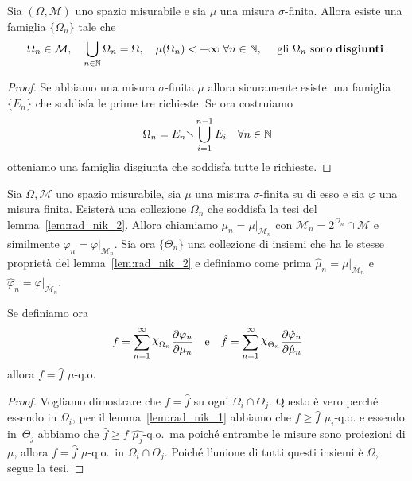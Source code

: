 \begin{lemma}\label{lem:rad_nik_2}
    Sia \({(\Omega, \mathcal{M})}\) uno spazio misurabile e sia \(\mu\) una
    misura \(\sigma\)-finita. Allora esiste una famiglia \(\{\Omega_n\}\) tale
    che 
    \[
        \Omega_n \in \mathcal{M}, \quad \bigcup_{n \in \mathbb{N}} \Omega_n =
        \Omega, \quad \mu(\Omega_n) < +\infty\,\, \forall n \in \mathbb{N}, \quad
        \text{ gli \(\Omega_{n}\) sono \textbf{disgiunti} }
    \]
\end{lemma}
\begin{proof}
    Se abbiamo una misura \(\sigma\)-finita \(\mu\) allora sicuramente esiste
    una famiglia \(\{E_{n}\} \) che soddisfa le prime tre richieste. Se ora
    costruiamo
    \[
        \Omega_{n} = E_{n} \sminus \bigcup_{i=1}^{n-1} E_{i} \quad \forall n \in \mathbb{N}
    \]
    otteniamo una famiglia disgiunta che soddisfa tutte le richieste.
\end{proof}

\begin{lemma}\label{lem:rad_nik_3}
    Sia \(\Omega, \mathcal{M}\) uno spazio misurabile, sia \(\mu\) una misura
    \(\sigma\)-finita su di esso e sia \(\varphi \) una misura finita. Esisterà una
    collezione \(\Omega_n\) che soddisfa la tesi del lemma~\ref{lem:rad_nik_2}.
    Allora chiamiamo \(\mu_n = \mu|_{\mathcal{M}_n} \) con \(\mathcal{M}_n =
    2^{\Omega_n} \cap \mathcal{M}\) e similmente \(\varphi_n = \varphi
    |_{\mathcal{M}_n} \). Sia ora \(\{\Theta_n\} \) una collezione di insiemi
    che ha le stesse proprietà del lemma~\ref{lem:rad_nik_2} e definiamo come
    prima \(\hat{\mu}_n = \mu|_{\hat{\mathcal{M}}_n} \) e \(\hat{\varphi}_n =
    \varphi|_{\hat{\mathcal{M}}_n} \). 

    Se definiamo ora
    \[
        f = \sum_{n=1}^{\infty} \rchi_{\Omega_n} \frac{\partial
        \varphi_n}{\partial \mu_n} \quad \text{e} \quad \hat{f} =
        \sum_{n=1}^{\infty} \rchi_{\Theta_n} \frac{\partial
        \hat{\varphi}_n}{\partial \hat{\mu}_n}
    \]
    allora \(f = \hat{f}\) \(\mu\)-q.o.
\end{lemma}
\begin{proof}
    Vogliamo dimostrare che \(f = \hat{f}\) su ogni \(\Omega_{i} \cap
    {\Theta_{j}}\). Questo è vero perché essendo in \(\Omega_{i}\), per il
    lemma~\ref{lem:rad_nik_1} abbiamo che \(f \ge \hat{f}\) \(\mu_i\)-q.o. e
    essendo in~\({\Theta_{j}}\) abbiamo che \(\hat{f} \ge f\)
    \(\hat{\mu_{j}}\)-q.o.~ma poiché entrambe le misure sono proiezioni di
    \(\mu\), allora \(f = \hat{f}\) \(\mu\)-q.o.~in \(\Omega_{i} \cap
    {\Theta_{j}}\). Poiché l'unione di tutti questi insiemi è \(\Omega\),
    segue la tesi.
\end{proof}

